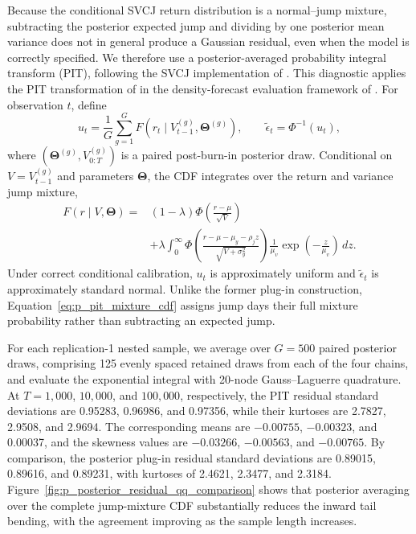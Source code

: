 {\color{red}
Because the conditional SVCJ return distribution is a normal--jump mixture,
subtracting the posterior expected jump and dividing by one posterior mean
variance does not in general produce a Gaussian residual, even when the model
is correctly specified. We therefore use a posterior-averaged probability
integral transform (PIT), following the SVCJ implementation of
\citet{Teng2026CertifiedVB}. This diagnostic applies the PIT transformation of
\citet{Rosenblatt1952} in the density-forecast evaluation framework of
\citet{DieboldGuntherTay1998}. For observation $t$, define
\begin{equation}
u_t=\frac{1}{G}\sum_{g=1}^{G}
F\!\left(r_t\mid V_{t-1}^{(g)},\bm{\Theta}^{(g)}\right),
\qquad
\widetilde\epsilon_t=\Phi^{-1}(u_t),
\label{eq:p_pit_residual}
\end{equation}
where $(\bm{\Theta}^{(g)},V_{0:T}^{(g)})$ is a paired post-burn-in posterior
draw. Conditional on $V=V_{t-1}^{(g)}$ and parameters $\bm{\Theta}$, the CDF
integrates over the return and variance jump mixture,
\begin{align}
F(r\mid V,\bm{\Theta})
={}&(1-\lambda)\Phi\!\left(\frac{r-\mu}{\sqrt V}\right) \nonumber\\
&+\lambda\int_0^\infty
\Phi\!\left(
\frac{r-\mu-\mu_y-\rho_j z}{\sqrt{V+\sigma_y^2}}
\right)\frac{1}{\mu_v}\exp\!\left(-\frac{z}{\mu_v}\right)\,dz.
\label{eq:p_pit_mixture_cdf}
\end{align}
Under correct conditional calibration, $u_t$ is approximately uniform and
$\widetilde\epsilon_t$ is approximately standard normal. Unlike the former
plug-in construction, Equation~\eqref{eq:p_pit_mixture_cdf} assigns jump days
their full mixture probability rather than subtracting an expected jump.

For each replication-1 nested sample, we average over $G=500$ paired posterior
draws, comprising 125 evenly spaced retained draws from each of the four
chains, and evaluate the exponential integral with 20-node Gauss--Laguerre
quadrature. At $T=1{,}000$, $10{,}000$, and $100{,}000$, respectively, the PIT
residual standard deviations are 0.95283, 0.96986, and 0.97356, while their
kurtoses are 2.7827, 2.9508, and 2.9694. The corresponding means are
$-0.00755$, $-0.00323$, and 0.00037, and the skewness values are $-0.03266$,
$-0.00563$, and $-0.00765$. By comparison, the posterior plug-in residual
standard deviations are 0.89015, 0.89616, and 0.89231, with kurtoses of
2.4621, 2.3477, and 2.3184. Figure~\ref{fig:p_posterior_residual_qq_comparison}
shows that posterior averaging over the complete jump-mixture CDF substantially
reduces the inward tail bending, with the agreement improving as the sample
length increases.

}
